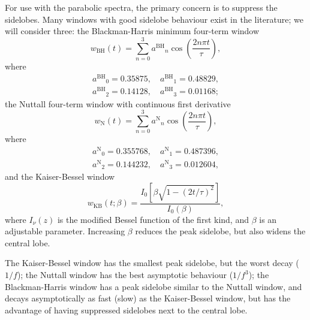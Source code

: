 \documentclass[useAMS,usedcolumn,usegraphicx,usenatbib]{mn2e}
\newcommand{\sub}[1]{\ensuremath{_\mathrm{#1}}}
\newcommand{\super}[1]{\ensuremath{^\mathrm{#1}}}
\begin{document}
For use with the parabolic spectra, the primary concern is to suppress the sidelobes. Many windows with good sidelobe behaviour exist in the literature; we will consider three: the Blackman-Harris minimum four-term window \citep{Harris1978, Nuttall1981}
\begin{equation}
w\sub{BH}(t) = \sum_{n=0}^{3} a\super{BH}_n\cos\left(\frac{2n\pi t}{\tau}\right),
\end{equation}
where
\begin{equation}
\begin{split}
a\super{BH}_0 = 0.35875, \quad a\super{BH}_1 = 0.48829,\\
a\super{BH}_2 = 0.14128, \quad a\super{BH}_3 = 0.01168;
\end{split}
\end{equation}
the Nuttall four-term window with continuous first derivative \citep{Nuttall1981}
\begin{equation}
w\sub{N}(t) = \sum_{n=0}^{3} a\super{N}_n\cos\left(\frac{2n\pi t}{\tau}\right),
\end{equation}
where
\begin{equation}
\begin{split}
a\super{N}_0 = 0.355768, \quad a\super{N}_1 = 0.487396,\\
a\super{N}_2 = 0.144232, \quad a\super{N}_3 = 0.012604,
\end{split}
\end{equation}
and the Kaiser-Bessel window \citep{Harris1978, Kaiser1980}
\begin{equation}
w\sub{KB}(t;\beta) = \frac{I_0\left[\beta\sqrt{1 - (2 t/\tau)^2}\right]}{I_0(\beta)},
\end{equation}
where $I_\nu(z)$ is the modified Bessel function of the first kind, and $\beta$ is an adjustable parameter. Increasing $\beta$ reduces the peak sidelobe, but also widens the central lobe.

The Kaiser-Bessel window has the smallest peak sidelobe, but the worst decay ($1/f$); the Nuttall window has the best asymptotic behaviour ($1/f^3$); the Blackman-Harris window has a peak sidelobe similar to the Nuttall window, and decays asymptotically as fast (slow) as the Kaiser-Bessel window, but has the advantage of having suppressed sidelobes next to the central lobe.
\end{document}

